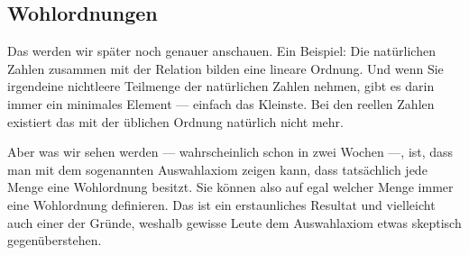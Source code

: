 \subsection{Wohlordnungen}
\begin{math-stroke}

\end{math-stroke}

\begin{spoken-clean}[01:17:57 - 01:19:48]
Das werden wir später noch genauer anschauen. Ein Beispiel: Die natürlichen Zahlen zusammen mit der Relation  bilden eine lineare Ordnung. Und wenn Sie irgendeine nichtleere Teilmenge der natürlichen Zahlen nehmen, gibt es darin immer ein minimales Element --- einfach das Kleinste. Bei den reellen Zahlen existiert das mit der üblichen Ordnung natürlich nicht mehr.

Aber was wir sehen werden --- wahrscheinlich schon in zwei Wochen ---, ist, dass man mit dem sogenannten Auswahlaxiom zeigen kann, dass tatsächlich jede Menge eine Wohlordnung besitzt. Sie können also auf egal welcher Menge immer eine Wohlordnung definieren. Das ist ein erstaunliches Resultat und vielleicht auch einer der Gründe, weshalb gewisse Leute dem Auswahlaxiom etwas skeptisch gegenüberstehen.
\end{spoken-clean}

